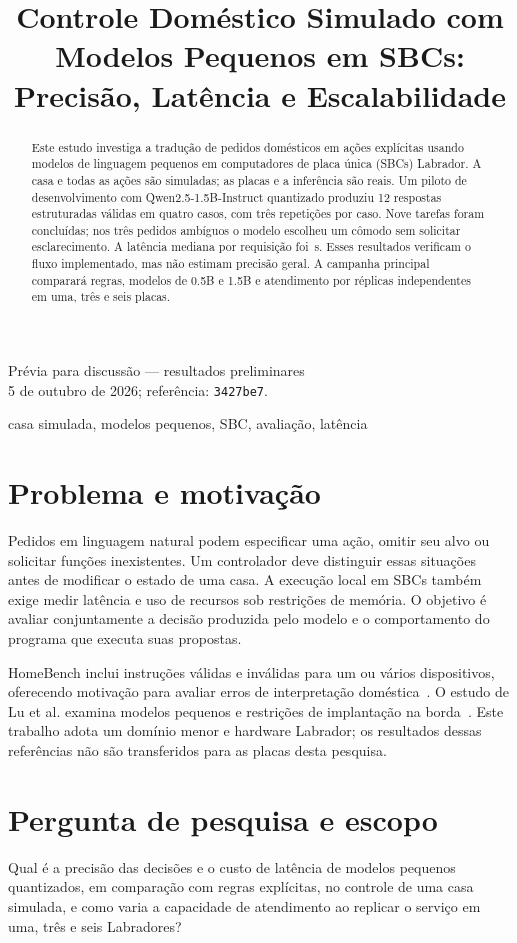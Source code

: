 \documentclass[letterpaper,conference]{IEEEtran}
\title{Controle Doméstico Simulado com Modelos Pequenos em SBCs: Precisão, Latência e Escalabilidade}
\author{\IEEEauthorblockN{Hudson Moreira, Marcelo Knörich Zuffo, Laisa Costa de Biase}}
\begin{document}
\maketitle
\begin{center}\footnotesize Prévia para discussão --- resultados preliminares\\
5 de outubro de 2026; referência: \texttt{3427be7}.\end{center}
\begin{abstract}
Este estudo investiga a tradução de pedidos domésticos em ações explícitas usando modelos de linguagem pequenos em computadores de placa única (SBCs) Labrador. A casa e todas as ações são simuladas; as placas e a inferência são reais. Um piloto de desenvolvimento com Qwen2.5-1.5B-Instruct quantizado produziu 12 respostas estruturadas válidas em quatro casos, com três repetições por caso. Nove tarefas foram concluídas; nos três pedidos ambíguos o modelo escolheu um cômodo sem solicitar esclarecimento. A latência mediana por requisição foi \PilotMedian\,s. Esses resultados verificam o fluxo implementado, mas não estimam precisão geral. A campanha principal comparará regras, modelos de 0.5B e 1.5B e atendimento por réplicas independentes em uma, três e seis placas.
\end{abstract}
\begin{IEEEkeywords}casa simulada, modelos pequenos, SBC, avaliação, latência\end{IEEEkeywords}
\section{Problema e motivação}
Pedidos em linguagem natural podem especificar uma ação, omitir seu alvo ou solicitar funções inexistentes. Um controlador deve distinguir essas situações antes de modificar o estado de uma casa. A execução local em SBCs também exige medir latência e uso de recursos sob restrições de memória. O objetivo é avaliar conjuntamente a decisão produzida pelo modelo e o comportamento do programa que executa suas propostas.

HomeBench inclui instruções válidas e inválidas para um ou vários dispositivos, oferecendo motivação para avaliar erros de interpretação doméstica~\cite{homebench}. O estudo de Lu et al. examina modelos pequenos e restrições de implantação na borda~\cite{edge}. Este trabalho adota um domínio menor e hardware Labrador; os resultados dessas referências não são transferidos para as placas desta pesquisa.
\section{Pergunta de pesquisa e escopo}
Qual é a precisão das decisões e o custo de latência de modelos pequenos quantizados, em comparação com regras explícitas, no controle de uma casa simulada, e como varia a capacidade de atendimento ao replicar o serviço em uma, três e seis Labradores?
\end{document}
